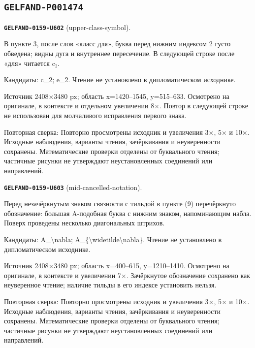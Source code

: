 \subsection*{\texttt{GELFAND-P001474}}
\par\noindent\leavevmode{}\label{GELFAND-0159-U602}\label{GELFAND-P001474:upper-class-symbol}\textbf{\texttt{GELFAND-0159-U602}} (upper-class-symbol).\nopagebreak[4]\par
В пункте 3, после слов «класс для», буква перед нижним индексом 2 густо обведена; видны дуга и внутреннее пересечение. В следующей строке после «для» читается c₂.\par
Кандидаты: c\_2; e\_2. Чтение не установлено в дипломатическом исходнике.\par
Источник 2408×3480 px; область x=1420–1545, y=515–633. Осмотрено на оригинале, в контексте и отдельном увеличении 8×. Повтор в следующей строке не использован для молчаливого исправления первого знака.\par
Повторная сверка: Повторно просмотрены исходник и увеличения 3×, 5× и 10×. Исходные наблюдения, варианты чтения, зачёркивания и неуверенности сохранены. Математические проверки отделены от буквального чтения; частичные рисунки не утверждают неустановленных соединений или направлений.\par\medskip
\par\noindent\leavevmode{}\label{GELFAND-0159-U603}\label{GELFAND-P001474:mid-cancelled-notation}\textbf{\texttt{GELFAND-0159-U603}} (mid-cancelled-notation).\nopagebreak[4]\par
Перед незачёркнутым знаком связности с тильдой в пункте (9) перечёркнуто обозначение: большая A-подобная буква с нижним знаком, напоминающим набла. Поверх проведены несколько диагональных штрихов.\par
Кандидаты: A\_\textbackslash{}nabla; A\_\{\textbackslash{}widetilde\textbackslash{}nabla\}. Чтение не установлено в дипломатическом исходнике.\par
Источник 2408×3480 px; область x=400–615, y=1210–1410. Осмотрено на оригинале, в контексте и увеличении 7×. Зачёркнутое обозначение сохранено как неуверенное чтение; наличие тильды в его индексе установить нельзя.\par
Повторная сверка: Повторно просмотрены исходник и увеличения 3×, 5× и 10×. Исходные наблюдения, варианты чтения, зачёркивания и неуверенности сохранены. Математические проверки отделены от буквального чтения; частичные рисунки не утверждают неустановленных соединений или направлений.\par\medskip
